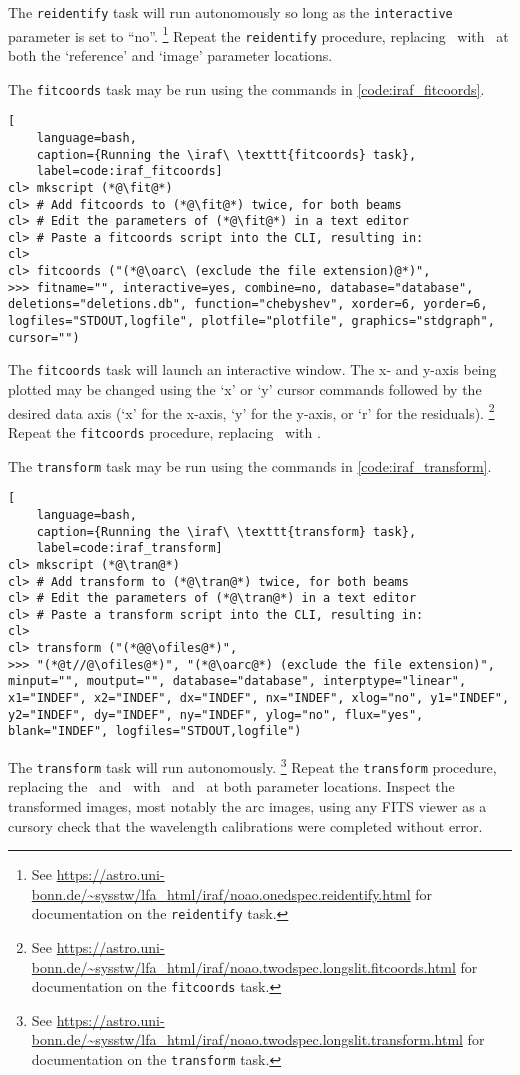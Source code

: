 \pagebreak

\noindent The \texttt{reidentify} task will run autonomously so long as the \texttt{interactive} parameter is set to ``no''.%
\footnote{See \protect\url{https://astro.uni-bonn.de/~sysstw/lfa_html/iraf/noao.onedspec.reidentify.html} for documentation on the \texttt{reidentify} task.}
Repeat the \texttt{reidentify} procedure, replacing \oarc\ with \earc\ at both the `reference' and `image' parameter locations.

The \texttt{fitcoords} task may be run using the commands in \autoref{code:iraf_fitcoords}.

\begin{lstlisting}[
    language=bash,
    caption={Running the \iraf\ \texttt{fitcoords} task},
    label=code:iraf_fitcoords]
cl> mkscript (*@\fit@*)
cl> # Add fitcoords to (*@\fit@*) twice, for both beams
cl> # Edit the parameters of (*@\fit@*) in a text editor
cl> # Paste a fitcoords script into the CLI, resulting in:
cl> 
cl> fitcoords ("(*@\oarc\ (exclude the file extension)@*)",
>>> fitname="", interactive=yes, combine=no, database="database", deletions="deletions.db", function="chebyshev", xorder=6, yorder=6, logfiles="STDOUT,logfile", plotfile="plotfile", graphics="stdgraph", cursor="")
\end{lstlisting}
{\parskip=0pt The} \texttt{fitcoords} task will launch an interactive window. The x- and y-axis being plotted may be changed using the `x' or `y' cursor commands followed by the desired data axis (`x' for the x-axis, `y' for the y-axis, or `r' for the residuals).%
\footnote{See \protect\url{https://astro.uni-bonn.de/~sysstw/lfa_html/iraf/noao.twodspec.longslit.fitcoords.html} for documentation on the \texttt{fitcoords} task.}
Repeat the \texttt{fitcoords} procedure, replacing \oarc\ with \earc.

The \texttt{transform} task may be run using the commands in \autoref{code:iraf_transform}.

\begin{lstlisting}[
    language=bash,
    caption={Running the \iraf\ \texttt{transform} task},
    label=code:iraf_transform]
cl> mkscript (*@\tran@*)
cl> # Add transform to (*@\tran@*) twice, for both beams
cl> # Edit the parameters of (*@\tran@*) in a text editor
cl> # Paste a transform script into the CLI, resulting in:
cl> 
cl> transform ("(*@@\ofiles@*)",
>>> "(*@t//@\ofiles@*)", "(*@\oarc@*) (exclude the file extension)", minput="", moutput="", database="database", interptype="linear", x1="INDEF", x2="INDEF", dx="INDEF", nx="INDEF", xlog="no", y1="INDEF", y2="INDEF", dy="INDEF", ny="INDEF", ylog="no", flux="yes", blank="INDEF", logfiles="STDOUT,logfile")
\end{lstlisting}
{\parskip=0pt The} \texttt{transform} task will run autonomously.%
\footnote{See \protect\url{https://astro.uni-bonn.de/~sysstw/lfa_html/iraf/noao.twodspec.longslit.transform.html} for documentation on the \texttt{transform} task.}
Repeat the \texttt{transform} procedure, replacing the \ofiles\ and \oarc\ with \efiles\ and \earc\ at both parameter locations. Inspect the transformed images, most notably the arc images, using any \gls{FITS} viewer as a cursory check that the wavelength calibrations were completed without error.


